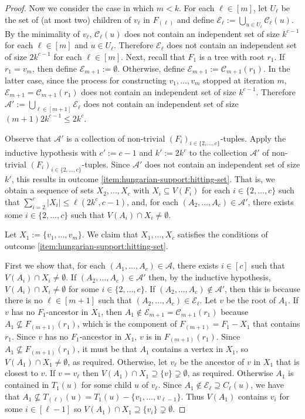 \documentclass{patmorin}
\begin{document}
\begin{proof}
Now we consider the case in which $m<k$.
For each $\ell\in[m]$, let $U_{\ell}$ be the set of (at most two) children of $v_\ell$ in $F_{(\ell)}$ and define $\mathcal{E}_{\ell}:=\bigcup_{u\in U_\ell}\mathcal{C}_{\ell}(u)$.  By the minimality of $v_\ell$, $\mathcal{C}_{\ell}(u)$ does not contain an independent set of size $k^{c-1}$ for each $\ell\in[m]$ and $u\in U_{\ell}$. Therefore $\mathcal{E}_{\ell}$ does not contain an independent set of size $2k^{c-1}$ for each $\ell\in[m]$.  Next, recall that $F_1$ is a tree with root $r_1$.  If $r_1 = v_m$, then define $\mathcal{E}_{m+1}:=\emptyset$. Otherwise, define $\mathcal{E}_{m+1}:=\mathcal{C}_{m+1}(r_1)$.  In the latter case, since the process for constructing $v_1,\ldots,v_m$ stopped at iteration $m$, $\mathcal{E}_{m+1}=\mathcal{C}_{m+1}(r_1)$ does not contain an independent set of size $k^{c-1}$. Therefore $\mathcal{A'}:=\bigcup_{\ell\in[m+1]}\mathcal{E}_\ell$ does not contain an independent set of size $(m+1)2k^{c-1} \le 2k^{c}$.

Observe that $\mathcal{A}'$ is a collection of non-trivial $(F_i)_{i\in\{2,\ldots,c\}}$-tuples.  Apply the inductive hypothesis with $c':=c-1$ and $k':=2k^{c}$ to the collection $\mathcal{A}'$ of non-trivial $(F_i)_{i\in\{2,\ldots,c\}}$-tuples.  Since $\mathcal{A}'$ does not contain an independent set of size $k'$, this results in outcome \cref{item:hungarian-support:hitting-set}.  That is, we obtain a sequence of sets $X_2,\ldots,X_c$ with $X_i\subseteq V(F_i)$ for each $i\in\{2,\ldots,c\}$ such that $\sum_{i=2}^c|X_i|\le\ell(2k^{c},c-1)$,  and, for each $(A_2,\ldots,A_c)\in\mathcal{A}'$, there exists some $i\in\{2,\ldots,c\}$ such that $V(A_i)\cap X_i\neq\emptyset$.

Let $X_1:=\{v_1,\ldots,v_m\}$.  We claim that $X_1,\ldots,X_c$ satisfies the conditions of outcome \cref{item:hungarian-support:hitting-set}.

First we show that, for each $(A_1,\ldots,A_c)\in\mathcal{A}$, there exists $i\in[c]$ such that $V(A_i)\cap X_i\neq\emptyset$.  If $(A_2,\ldots,A_c)\in \mathcal{A}'$ then, by the inductive hypothesis, $V(A_i)\cap X_i\neq\emptyset$ for some $i\in\{2,\ldots,c\}$.  If $(A_2,\ldots,A_c)\notin\mathcal{A}'$, then this is because there is no $\ell\in[m+1]$ such that $(A_2,\ldots,A_c)\in\mathcal{E}_{\ell}$. Let $v$ be the root of $A_1$.  If $v$ has no $F_1$-ancestor in $X_1$, then $A_1\notin\mathcal{E}_{m+1}=\mathcal{C}_{m+1}(r_1)$ because $A_1\not\subseteq F_{(m+1)}(r_1)$, which is the component of $F_{(m+1)}=F_1-X_1$ that contains $r_1$.  Since $v$ has no $F_1$-ancestor in $X_1$, $v$ is in $F_{(m+1)}(r_1)$. Since $A_1\not\subseteq F_{(m+1)}(r_1)$, it must be that $A_1$ contains a vertex in $X_1$, so $V(A_1)\cap X_1\neq\emptyset$, as required.  Otherwise, let $v_\ell$ be the ancestor of $v$ in $X_1$ that is closest to $v$.  If $v=v_\ell$ then $V(A_1)\cap X_1\supseteq\{v\}\supsetneq\emptyset$, as required.  Otherwise $A_1$ is contained in $T_1(u)$ for some child $u$ of $v_\ell$.  Since $A_1\notin\mathcal{E}_{\ell}\supseteq C_{\ell}(u)$, we have that $A_1\not\subseteq T_{(\ell)}(u)=T_1(u)-\{v_1,\ldots,v_{\ell-1}\}$.  Thus $V(A_1)$ contains $v_i$ for some $i\in[\ell-1]$ so $V(A_1)\cap X_1\supseteq\{v_i\}\supsetneq\emptyset$.



\end{proof}
\end{document}
